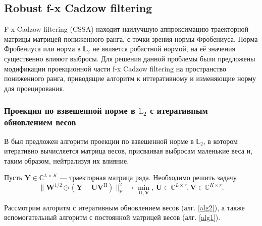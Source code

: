 \documentclass[specialist,
               substylefile = spbu.rtx,
               subf,href,colorlinks=true, 12pt]{disser}
\begin{document}
\subsection{Robust f-x Cadzow filtering}
\label{sub:fxRobust}

F-x Cadzow filtering (CSSA) находит наилучшую аппроксимацию траекторной матрицы матрицей пониженного ранга, с точки зрения нормы Фробениуса. Норма Фробениуса или норма в $\mathbb{L}_2$ не является робастной нормой, на её значения существенно влияют выбросы. Для решения данной проблемы были предложены модификации проекционной части f-x Cadzow filtering на пространство пониженного ранга, приводящие алгоритм к иттеративному и изменяющие норму для проецирования.

\subsubsection{Проекция по взвешенной норме в $\mathbb{L}_2$ с итеративным обновлением весов}

В \cite{Chen} был предложен алгоритм проекции по взвешенной норме в $\mathbb{L}_2$, в котором итеративно вычисляется матрица весов, присваивая выбросам маленькие веса и, таким образом, нейтрализуя их влияние. 

Пусть $\mathbf{Y} \in \mathbb{C}^{L\times K}$ --- траекторная матрица ряда.
Необходимо решить задачу
\begin{equation*}
		\|\mathbf{W}^{1/2}\odot(\mathbf{Y}-\mathbf{U}\mathbf{V}^{\mathrm{H}})\|^2_\mathrm{F} \longrightarrow \min_{\mathbf{U},\mathbf{V}}, \, \mathbf{U} \in \mathbb{C}^{L\times r}, \mathbf{V} \in \mathbb{C}^{K\times r}.
\end{equation*}

Рассмотрим алгоритм с итеративным обновлением весов (алг. \ref{alg2}), а также вспомогательный алгоритм с постоянной матрицей весов (алг. \ref{alg1}).
\end{document}
